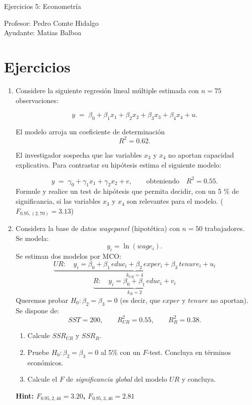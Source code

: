 \documentclass[10pt,a4paper]{article}
\begin{document}
\vspace{5cm}

\begin{center}
    {\Large  Ejercicios 5: Econometría }

Profesor:    Pedro Comte Hidalgo \\
Ayudante: Matias Balboa
\end{center}



\section{Ejercicios}
\begin{enumerate}
    \item Considere la siguiente regresión lineal múltiple estimada con \(n = 75\) observaciones:

\[
y \;=\; \beta_{0} + \beta_{1}x_{1} + \beta_{2}x_{2} + \beta_{3}x_{3} + \beta_{4}x_{4} + u.
\]

El modelo arroja un coeficiente de determinación
\[
R^2 = 0.62.
\]

El investigador sospecha que las variables \(x_{3}\) y \(x_{4}\) no aportan capacidad explicativa.  
Para contrastar su hipótesis estima el siguiente modelo:

\[
y \;=\; \gamma_{0} + \gamma_{1}x_{1} + \gamma_{2}x_{2} + e,
\qquad\text{obteniendo}\quad
R^2 = 0.55.
\]
Formule y realice un test de hipótesis que permita decidir, con un 5 \% de significancia, si las variables \(x_{3}\) y \(x_{4}\) son relevantes para el modelo. ($F_{0.95,(2,70)}=3.13$)



\item Considera la base de datos \emph{wagepanel} (hipotética) con $n=50$ trabajadores. Se modela:
\[
y_i=\ln(wage_i).
\]
Se estiman dos modelos por MCO:
\[
\underbrace{UR:\quad y_i=\beta_0+\beta_1\,educ_i+\beta_2\,exper_i+\beta_3\,tenure_i+u_i}_{k_{UR}=4}
\]
\[
\underbrace{R:\quad y_i=\beta_0+\beta_1\,educ_i+v_i}_{k_{R}=2}
\]
Queremos probar $H_0:\beta_2=\beta_3=0$ (es decir, que $exper$ y $tenure$ no aportan). Se dispone de:
\[
SST=200,\qquad R^2_{UR}=0.55,\qquad R^2_{R}=0.38.
\]
\begin{enumerate}
  \item Calcule $SSR_{UR}$ y $SSR_R$.
  \item Pruebe $H_0:\beta_2=\beta_3=0$ al 5\% con un $F$-test. Concluya en términos económicos.
  \item Calcule el $F$ de \emph{significancia global} del modelo $UR$ y concluya.
\end{enumerate}
\textbf{Hint: $F_{0.95,2,46}=3.20$, $F_{0.95,3,46}=2.81$}


\end{enumerate}
\end{document}
